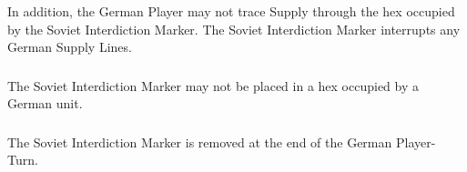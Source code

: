 \subsubsection{} In addition, the German Player may not trace Supply through the hex occupied by the Soviet Interdiction Marker. The Soviet Interdiction Marker interrupts any German Supply Lines.

\subsubsection{} The Soviet Interdiction Marker may not be placed in a hex occupied by a German unit.

\subsubsection{} The Soviet Interdiction Marker is removed at the end of the German Player-Turn.